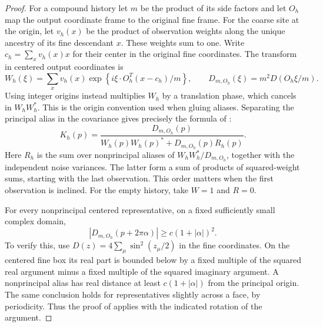 \begin{proof}
For a compound history let $m$ be the product of its side factors
and let $O_h$ map the output coordinate frame to the original fine
frame.  For the coarse site at the origin, let $v_h(x)$ be the product
of observation weights along the unique ancestry of its fine
descendant $x$.  These weights sum to one.  Write
$c_h=\sum_xv_h(x)x$ for their center in the original fine coordinates.
The transform in centered output coordinates is
\[
 W_h(\xi)=\sum_xv_h(x)
   \exp\left\{i\xi\cdot O_h^T(x-c_h)/m\right\},
 \qquad D_{m,O_h}(\xi)=m^2D(O_h\xi/m).
\]
Using integer origins instead multiplies $W_h$ by a translation phase,
which cancels in $W_hW_h^*$.  This is the origin convention used when
gluing aliases.
Separating the principal alias in the covariance gives precisely the
formula of :
\begin{equation}
 K_{h}(p)=
 \frac{D_{m,O_{h}}(p)}
 {W_{h}(p)W_{h}(p)^*
       +D_{m,O_{h}}(p)R_{h}(p)}.
 \label{eq:free-explicit}
\end{equation}
Here $R_{h}$ is the sum over nonprincipal aliases of
$W_{h}W_{h}^*/D_{m,O_{h}}$, together with
the independent noise variances.  The latter form a sum of products
of squared-weight sums, starting with the last observation.  This
order matters when the first observation is inclined.
For the empty history, take $W=1$ and $R=0$.

For every nonprincipal centered representative, on a fixed sufficiently
small complex domain,
\begin{equation}
 |D_{m,O_{h}}(p+2\pi\alpha)|
 \ge c(1+|\alpha|)^2.
 \label{eq:free-alias-denominator}
\end{equation}
To verify this, use $D(z)=4\sum_\mu\sin^2(z_\mu/2)$ in the fine
coordinates.  On the centered fine box its real part is bounded below
by a fixed multiple of the squared real argument minus a fixed
multiple of the squared imaginary argument.  A nonprincipal alias
has real distance at least $c(1+|\alpha|)$ from the principal origin.
The same conclusion holds for representatives slightly across a face,
by periodicity.  Thus the proof of  applies with
the indicated rotation of the argument.


\end{proof}
